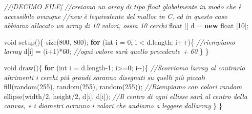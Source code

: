 \documentclass[
]{article}
\newenvironment{Shaded}{}{}
\newcommand{\CommentTok}[1]{\textcolor[rgb]{0.38,0.63,0.69}{\textit{#1}}}
\newcommand{\ControlFlowTok}[1]{\textcolor[rgb]{0.00,0.44,0.13}{\textbf{#1}}}
\newcommand{\DataTypeTok}[1]{\textcolor[rgb]{0.56,0.13,0.00}{#1}}
\newcommand{\DecValTok}[1]{\textcolor[rgb]{0.25,0.63,0.44}{#1}}
\newcommand{\FunctionTok}[1]{\textcolor[rgb]{0.02,0.16,0.49}{#1}}
\newcommand{\KeywordTok}[1]{\textcolor[rgb]{0.00,0.44,0.13}{\textbf{#1}}}
\newcommand{\NormalTok}[1]{#1}
\newcommand{\OperatorTok}[1]{\textcolor[rgb]{0.40,0.40,0.40}{#1}}
\begin{document}
\begin{Shaded}
\begin{Highlighting}[]
\CommentTok{//[DECIMO FILE]}
\CommentTok{//creiamo un array di tipo float globalmente in modo che è accessibile ovunque}
\CommentTok{//new è l\textquotesingle{}equivalente del malloc in C, ed in questo caso abbiamo allocato un array di 10 valori, ossia 10 cerchi}
\DataTypeTok{float} \OperatorTok{[]}\NormalTok{ d }\OperatorTok{=} \KeywordTok{new} \DataTypeTok{float} \OperatorTok{[}\DecValTok{10}\OperatorTok{];} 

\DataTypeTok{void} \FunctionTok{setup}\OperatorTok{()\{}
  \FunctionTok{size}\OperatorTok{(}\DecValTok{800}\OperatorTok{,} \DecValTok{800}\OperatorTok{);}
  \ControlFlowTok{for} \OperatorTok{(}\DataTypeTok{int}\NormalTok{ i }\OperatorTok{=} \DecValTok{0}\OperatorTok{;}\NormalTok{ i }\OperatorTok{\textless{}}\NormalTok{ d}\OperatorTok{.}\FunctionTok{length}\OperatorTok{;}\NormalTok{ i}\OperatorTok{++)\{} \CommentTok{//riempiamo l\textquotesingle{}array}
\NormalTok{    d}\OperatorTok{[}\NormalTok{i}\OperatorTok{]} \OperatorTok{=} \OperatorTok{(}\NormalTok{i}\OperatorTok{+}\DecValTok{1}\OperatorTok{)*}\DecValTok{60}\OperatorTok{;} \CommentTok{//ogni valore sarà quello precedente + 60}
  \OperatorTok{\}}
\OperatorTok{\}}

\DataTypeTok{void} \FunctionTok{draw}\OperatorTok{()\{}
  \ControlFlowTok{for} \OperatorTok{(}\DataTypeTok{int}\NormalTok{ i }\OperatorTok{=}\NormalTok{ d}\OperatorTok{.}\FunctionTok{length}\OperatorTok{{-}}\DecValTok{1}\OperatorTok{;}\NormalTok{ i}\OperatorTok{\textgreater{}=}\DecValTok{0}\OperatorTok{;}\NormalTok{ i}\OperatorTok{{-}{-})\{} \CommentTok{//Scorriamo l\textquotesingle{}array al contrario altrimenti i cerchi più grandi saranno disegnati su quelli più piccoli }
    \FunctionTok{fill}\OperatorTok{(}\FunctionTok{random}\OperatorTok{(}\DecValTok{255}\OperatorTok{),} \FunctionTok{random}\OperatorTok{(}\DecValTok{255}\OperatorTok{),} \FunctionTok{random}\OperatorTok{(}\DecValTok{255}\OperatorTok{));} \CommentTok{//Riempiamo con colori random}
    \FunctionTok{ellipse}\OperatorTok{(}\NormalTok{width}\OperatorTok{/}\DecValTok{2}\OperatorTok{,}\NormalTok{ height}\OperatorTok{/}\DecValTok{2}\OperatorTok{,}\NormalTok{ d}\OperatorTok{[}\NormalTok{i}\OperatorTok{],}\NormalTok{ d}\OperatorTok{[}\NormalTok{i}\OperatorTok{]);} \CommentTok{//Il centro di ogni ellisse sarà al centro della canvas, e i diametri avranno i valori che andiamo a leggere dall\textquotesingle{}array}
  \OperatorTok{\}}
  \OperatorTok{\}}



\end{Highlighting}
\end{Shaded}
\end{document}
